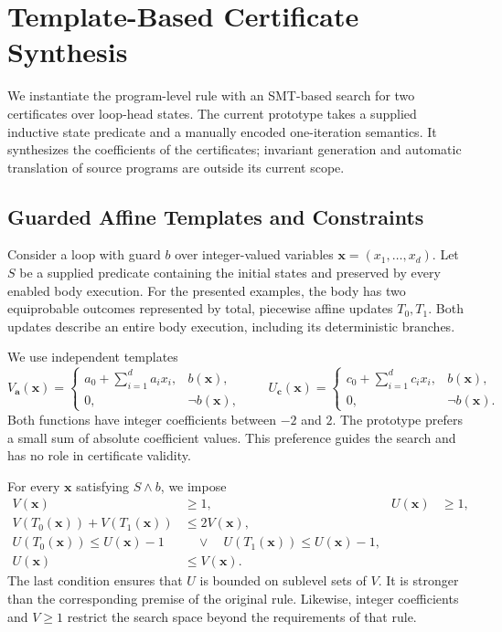 \section{Template-Based Certificate Synthesis}
\label{sec:certificate-synthesis}

We instantiate the program-level rule with an SMT-based search for two
certificates over loop-head states. The current prototype takes a supplied
inductive state predicate and a manually encoded one-iteration semantics.
It synthesizes the coefficients of the certificates; invariant generation and
automatic translation of source programs are outside its current scope.

\subsection{Guarded Affine Templates and Constraints}
\label{sec:synthesis-constraints}

Consider a loop with guard $b$ over integer-valued variables
$\mathbf{x}=(x_1,\ldots,x_d)$. Let $S$ be a supplied predicate containing
the initial states and preserved by every enabled body execution. For the
presented examples, the body has two equiprobable outcomes represented by
total, piecewise affine updates $T_0,T_1$. Both updates describe an entire
body execution, including its deterministic branches.

We use independent templates
\[
 V_{\mathbf a}(\mathbf{x})=
 \begin{cases}a_0+\sum_{i=1}^d a_i x_i,&b(\mathbf{x}),\\0,&\neg b(\mathbf{x}),\end{cases}
 \qquad
 U_{\mathbf c}(\mathbf{x})=
 \begin{cases}c_0+\sum_{i=1}^d c_i x_i,&b(\mathbf{x}),\\0,&\neg b(\mathbf{x}).\end{cases}
\]
Both functions have integer coefficients between $-2$ and $2$.
The prototype prefers a small sum of absolute coefficient values.
This preference guides the search and has no role in certificate validity.

For every $\mathbf{x}$ satisfying $S\land b$, we impose
\begin{align}
 V(\mathbf{x})&\geq 1,& U(\mathbf{x})&\geq 1,
 \label{eq:syn-positive}\\
 V(T_0(\mathbf{x}))+V(T_1(\mathbf{x}))&\leq 2V(\mathbf{x}),
 \label{eq:syn-supermartingale}\\
 U(T_0(\mathbf{x}))\leq U(\mathbf{x})-1
 &\quad\lor\quad U(T_1(\mathbf{x}))\leq U(\mathbf{x})-1,
 \label{eq:syn-progress}\\
 U(\mathbf{x})&\leq V(\mathbf{x}).
 \label{eq:syn-domination}
\end{align}
The last condition ensures that $U$ is bounded on sublevel sets of $V$.
It is stronger than the corresponding premise of the original rule.
Likewise, integer coefficients and
$V\geq1$ restrict the search space beyond the requirements of that rule.

